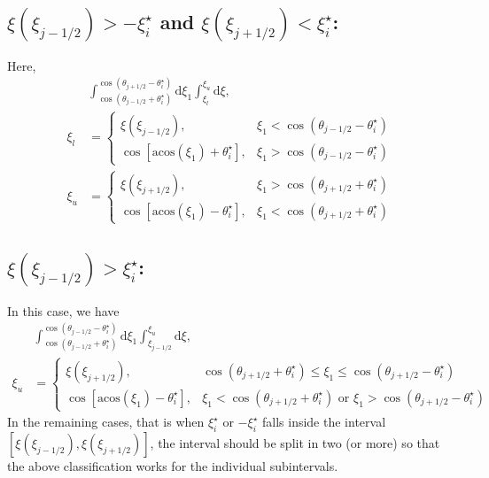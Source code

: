 \documentclass[11pt,a4paper]{article}
\newcommand{\rd}{\ensuremath{\mathrm{d}}}
\begin{document}
\subsection{$\xi(\xi_{j-1/2}) > -\xi_i^\star$ and $\xi(\xi_{j+1/2}) < \xi_i^\star$:}
Here,
\begin{align}
&\int_{\cos(\theta_{j-1/2}+\theta_i^\star)}^{\cos(\theta_{j+1/2}-\theta_i^\star)}\rd \xi_1 \int_{\xi_l}^{\xi_u} \rd \xi, \nonumber \\
\xi_l &= \begin{cases}
\xi(\xi_{j-1/2}), & \xi_1 <  \cos(\theta_{j-1/2}-\theta_i^\star) \\
\cos[\mathrm{acos}(\xi_1)+\theta_i^\star], & \xi_1 > \cos(\theta_{j-1/2}-\theta_i^\star) 
\end{cases} \\
\xi_u &= \begin{cases}
\xi(\xi_{j+1/2}), & \xi_1 > \cos(\theta_{j+1/2}+\theta_i^\star) \\
\cos[\mathrm{acos}(\xi_1) - \theta_i^\star], & \xi_1 < \cos(\theta_{j+1/2}+\theta_i^\star)
\end{cases}
\end{align}


\subsection{$\xi(\xi_{j-1/2}) > \xi_i^\star$:}
In this case, we have
\begin{align}
&\int_{\cos(\theta_{j-1/2}+\theta_i^\star)}^{\cos(\theta_{j-1/2}-\theta_i^\star)}\rd \xi_1 \int_{\xi_{j-1/2}}^{\xi_u} \rd \xi, \nonumber \\
\xi_u &= \begin{cases}
\xi(\xi_{j+1/2}), & \cos(\theta_{j+1/2}+\theta_i^\star) \leq \xi_1 \leq \cos(\theta_{j+1/2}-\theta_i^\star) \\
\cos[\mathrm{acos}(\xi_1)-\theta_i^\star], & \xi_1 < \cos(\theta_{j+1/2}+\theta_i^\star) \text{ or } \xi_1 > \cos(\theta_{j+1/2}-\theta_i^\star) 
\end{cases}
\end{align}
In the remaining cases, that is when $\xi_i^\star$ or $-\xi_i^\star$ falls inside the interval $[\xi(\xi_{j-1/2}), \xi(\xi_{j+1/2})]$, the interval should be split in two (or more) so that the above classification works for the individual subintervals.
\end{document}
